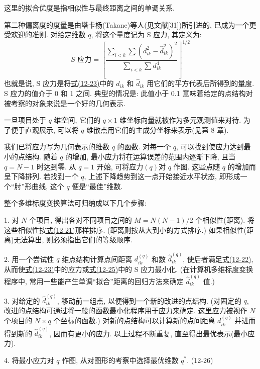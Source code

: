 
这里的拟合优度是指相似性与最终距离之间的单调关系.

第二种偏离度的度量是由塔卡杨(Takane)等人(见文献[31])所引进的, 已成为一个更受欢迎的准则. 对给定维数 $q$, 将这个量度记为 S 应力, 其定义为:
\label{eq:12-25}
\begin{equation}
S \text{ 应力} = \left[ \frac{\sum\limits_{i<k}\sum (d_{ik}^2 - \hat{d}_{ik}^2)^2}{\sum\limits_{i<k}\sum d_{ik}^4} \right]^{1/2} \tag{12-25}
\end{equation}
也就是说, S 应力是将\hyperref[eq:12-23]{式(12-23)}中的 $d_{ik}$ 和 $\hat{d}_{ik}$ 用它们的平方代表后所得到的量度. S 应力的值介于 0 和 1 之间. 典型的情况是: 此值小于 0.1 意味着给定的点结构对被考察的对象来说是一个好的几何表示.

一旦项目处于 $q$ 维空间, 它们的 $q\times 1$ 维坐标向量就被作为多元观测值来对待. 为了便于直观展示, 可以将 $q$ 维散点用它们的主成分坐标来表示(见第 8 章).

我们已将应力写为几何表示的维数 $q$ 的函数. 对每一个 $q$, 可以找到使应力达到最小的点结构. 随着 $q$ 的增加, 最小应力将在运算误差的范围内逐渐下降, 且当 $q=N-1$ 时达到零. 从 $q=1$ 开始, 可将应力$(q)$对 $q$ 作图. 这些点随 $q$ 的增加而呈下降排列. 若找到一个 $q$, 上述下降趋势到这一点开始接近水平状态, 即形成一个“肘”形曲线, 这个 $q$ 便是“最佳”维数.

整个多维标度变换算法可归纳成以下几个步骤:

1. 对 $N$ 个项目, 得出各对不同项目之间的 $M=N(N-1)/2$ 个相似性(距离). 将这些相似性按\hyperref[eq:12-21]{式(12-21)}那样排序. (距离则按从大到小的方式排序.) 如果相似性(距离)无法算出, 则必须指出它们的等级顺序.

2. 用一个尝试性 $q$ 维点结构计算点间距离 $d_{ik}^{(q)}$ 和数 $\hat{d}_{ik}^{(q)}$, 使后者满足\hyperref[eq:12-22]{式(12-22)}, 从而使\hyperref[eq:12-23]{式(12-23)}中的应力或\hyperref[eq:12-25]{式(12-25)}中的 S 应力最小化. (在计算机多维标度变换程序中, 常用一些能产生单调“拟合”距离的回归方法来确定 $\hat{d}_{ik}^{(q)}$ 值.)

3. 对给定的 $\hat{d}_{ik}^{(q)}$, 移动前一组点, 以便得到一个新的改进的点结构. (对固定的 $q$, 改进的点结构可通过将一般的函数最小化程序用于应力来确定. 这里应力被视作 $N$ 个项目的 $N\times q$ 个坐标的函数.) 对新的点结构可以计算新的点间距离 $d_{ik}^{(q)}$ 并进而得到新的 $\hat{d}_{ik}^{(q)}$, 因而有更小的应力. 以上过程不断重复, 直至得出最优表示(最小应力).

4. 将最小应力对 $q$ 作图, 从对图形的考察中选择最优维数 $q^{*}$. \hfill (12-26)

